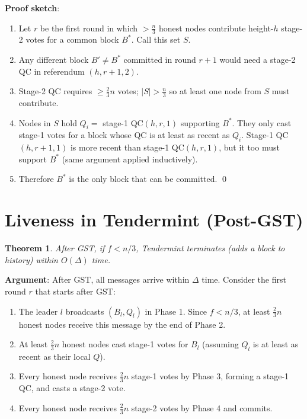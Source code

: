 \documentclass[12pt,a4paper,openany]{book}
\theoremstyle{definition}
\theoremstyle{plain}
\newtheorem{theorem}{Theorem}[chapter]
\theoremstyle{remark}
\begin{document}
\textbf{Proof sketch}:
\begin{enumerate}
  \item Let $r$ be the first round in which $>\frac{n}{3}$ honest nodes
        contribute height-$h$ stage-2 votes for a common block $B^*$.
        Call this set $S$.
  \item Any different block $B'\neq B^*$ committed in round $r+1$ would
        need a stage-2 QC in referendum $(h,r+1,2)$.
  \item Stage-2 QC requires $\geq\frac{2}{3}n$ votes; $|S|>\frac{n}{3}$
        so at least one node from $S$ must contribute.
  \item Nodes in $S$ hold $Q_i=$ stage-1 QC$(h,r,1)$ supporting $B^*$.
        They only cast stage-1 votes for a block whose QC is at least as
        recent as $Q_i$.  Stage-1 QC$(h,r+1,1)$ is more recent than
        stage-1 QC$(h,r,1)$, but it too must support $B^*$ (same argument
        applied inductively).
  \item Therefore $B^*$ is the only block that can be committed. \qed
\end{enumerate}

\section{Liveness in Tendermint (Post-GST)}

\begin{theorem}
  After GST, if $f < n/3$, Tendermint terminates (adds a block to
  history) within $O(\Delta)$ time.
\end{theorem}

\textbf{Argument}: After GST, all messages arrive within $\Delta$ time.
Consider the first round $r$ that starts after GST:
\begin{enumerate}
  \item The leader $l$ broadcasts $(B_l, Q_l)$ in Phase 1.  Since
        $f < n/3$, at least $\frac{2}{3}n$ honest nodes receive this
        message by the end of Phase 2.
  \item At least $\frac{2}{3}n$ honest nodes cast stage-1 votes for
        $B_l$ (assuming $Q_l$ is at least as recent as their local $Q$).
  \item Every honest node receives $\frac{2}{3}n$ stage-1 votes by
        Phase 3, forming a stage-1 QC, and casts a stage-2 vote.
  \item Every honest node receives $\frac{2}{3}n$ stage-2 votes by
        Phase 4 and commits.
\end{enumerate}
\end{document}
